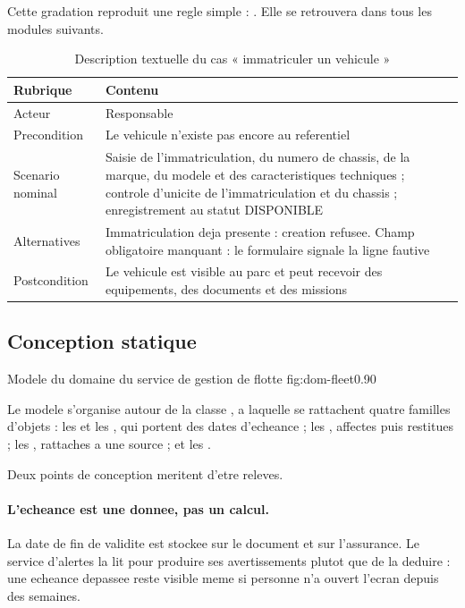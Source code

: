 Cette gradation reproduit une regle simple : . Elle se retrouvera dans tous
les modules suivants.

\begin{table}[H]
\centering
\caption{Description textuelle du cas « immatriculer un vehicule »}
\label{tab:desc-immat}
\small
\begin{tabularx}{\textwidth}{@{}p{2.5cm}X@{}}
\toprule
\textbf{Rubrique} & \textbf{Contenu} \\ \midrule
Acteur & Responsable \\
Precondition & Le vehicule n'existe pas encore au referentiel \\
Scenario nominal & Saisie de l'immatriculation, du numero de chassis, de
  la marque, du modele et des caracteristiques techniques ; controle
  d'unicite de l'immatriculation et du chassis ; enregistrement au statut
  DISPONIBLE \\
Alternatives & Immatriculation deja presente : creation refusee. Champ
  obligatoire manquant : le formulaire signale la ligne fautive \\
Postcondition & Le vehicule est visible au parc et peut recevoir des
  equipements, des documents et des missions \\
\bottomrule
\end{tabularx}
\end{table}

\subsection{Conception statique}

  {Modele du domaine du service de gestion de flotte}
  {fig:dom-fleet}{0.90}

Le modele s'organise autour de la classe , a laquelle
se rattachent quatre familles d'objets : les  et les , qui portent des dates
d'echeance ; les , affectes puis restitues ; les
, rattaches a une source ; et les
.

Deux points de conception meritent d'etre releves.

\paragraph{L'echeance est une donnee, pas un calcul.}
La date de fin de validite est stockee sur le document et sur
l'assurance. Le service d'alertes la lit pour produire ses avertissements
plutot que de la deduire : une echeance depassee reste visible meme si
personne n'a ouvert l'ecran depuis des semaines.

